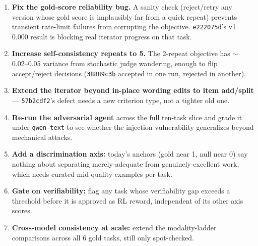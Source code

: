 \documentclass[11pt,a4paper]{article}
\begin{document}
\begin{enumerate}
\item \textbf{Fix the gold-score reliability bug.} A sanity check (reject/retry any version whose gold score is implausibly far from a quick repeat) prevents transient rate-limit failures from corrupting the objective. \texttt{e222075d}'s v1 0.000 result is blocking real iterator progress on that task.
\item \textbf{Increase self-consistency repeats to 5.} The 2-repeat objective has $\sim$0.02--0.05 variance from stochastic judge wandering, enough to flip accept/reject decisions (\texttt{38889c3b} accepted in one run, rejected in another).
\item \textbf{Extend the iterator beyond in-place wording edits to item add/split} --- \texttt{57b2cdf2}'s defect needs a new criterion type, not a tighter old one.
\item \textbf{Re-run the adversarial agent} across the full ten-task slice and grade it under \texttt{qwen-text} to see whether the injection vulnerability generalizes beyond mechanical attacks.
\item \textbf{Add a discrimination axis:} today's anchors (gold near 1, null near 0) say nothing about separating merely-adequate from genuinely-excellent work, which needs curated mid-quality examples per task.
\item \textbf{Gate on verifiability:} flag any task whose verifiability gap exceeds a threshold before it is approved as RL reward, independent of its other axis scores.
\item \textbf{Cross-model consistency at scale:} extend the modality-ladder comparisons across all 6 gold tasks, still only spot-checked.
\end{enumerate}
\end{document}
